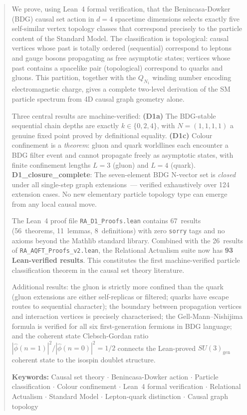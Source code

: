 \documentclass[11pt,a4paper]{article}
\begin{document}
\begin{abstract}
We prove, using Lean~4 formal verification, that the Benincasa-Dowker
(BDG) causal set action in $d=4$ spacetime dimensions selects exactly
five self-similar vertex topology classes that correspond precisely to
the particle content of the Standard Model. The classification is
topological: causal vertices whose past is totally ordered (sequential)
correspond to leptons and gauge bosons propagating as free asymptotic
states; vertices whose past contains a spacelike pair (topological)
correspond to quarks and gluons. This partition, together with the
$Q_{N_1}$ winding number encoding electromagnetic charge, gives a
complete two-level derivation of the SM particle spectrum from
4D causal graph geometry alone.

Three central results are machine-verified:
\textbf{(D1a)} The BDG-stable sequential chain depths are exactly
$k \in \{0, 2, 4\}$, with $N{=}(1,1,1,1)$ a genuine fixed point proved
by definitional equality.
\textbf{(D1c)} Colour confinement is a \emph{theorem}: gluon and quark
worldlines each encounter a BDG filter event and cannot propagate
freely as asymptotic states, with finite confinement lengths $L{=}3$
(gluon) and $L{=}4$ (quark).
\textbf{D1\_closure\_complete}: The seven-element BDG N-vector set is
\emph{closed} under all single-step graph extensions~--- verified
exhaustively over 124 extension cases. No new elementary particle
topology type can emerge from any local causal move.

The Lean~4 proof file \texttt{RA\_D1\_Proofs.lean} contains 67~results
(56~theorems, 11~lemmas, 8~definitions) with zero \texttt{sorry} tags
and no axioms beyond the Mathlib standard library. Combined with the
26~results of \texttt{RA\_AQFT\_Proofs\_v2.lean}, the Relational
Actualism suite now has \textbf{93 Lean-verified results}.
This constitutes the first machine-verified particle classification
theorem in the causal set theory literature.

Additional results: the gluon is strictly more confined than the quark
(gluon extensions are either self-replicas or filtered; quarks have
escape routes to sequential character); the boundary between
propagation vertices and interaction vertices is precisely characterised;
the Gell-Mann--Nishijima formula is verified for all six first-generation
fermions in BDG language; and the coherent state Clebsch-Gordan ratio
$|\hat{\phi}(n{=}1)|^2/|\hat{\phi}(n{=}0)|^2 = 1/2$ connects the
Lean-proved $SU(3)_{\mathrm{gen}}$ coherent state to the
isospin doublet structure.

\medskip
\noindent\textbf{Keywords:} Causal set theory $\cdot$ Benincasa-Dowker action
$\cdot$ Particle classification $\cdot$ Colour confinement $\cdot$
Lean~4 formal verification $\cdot$ Relational Actualism $\cdot$ Standard Model
$\cdot$ Lepton-quark distinction $\cdot$ Causal graph topology
\end{abstract}
\end{document}
